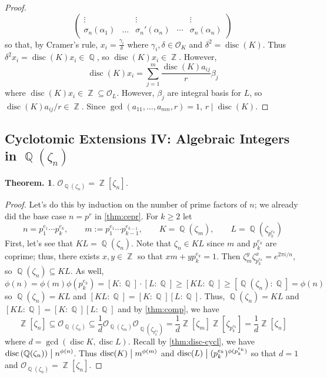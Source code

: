 \documentclass[11pt, a4paper]{memoir}
\DeclareMathOperator{\Q}{{\mathbb{Q}}}
\DeclareMathOperator{\Z}{{\mathbb{Z}}}
\renewcommand{\div}{\bigm|}
\theoremstyle{change}
\newtheorem{theorem}{Theorem.}[section]
\theoremstyle{plain}
\theoremstyle{nonumberplain}
\newtheorem{proof}{Proof}
\DeclareMathOperator{\disc}{disc}
\numberwithin{equation}{section}
\begin{document}
\begin{proof}
\begin{equation*}
\begin{pmatrix}
            \vdots&&\vdots&&\vdots\\
            \sigma_n(\alpha_1)&\hdots&\sigma_n'(\alpha_n)&\cdots&\sigma_n(\alpha_n)
        \end{pmatrix}
    \end{equation*}
    so that, by Cramer's rule, $x_i=\frac{\gamma_i}{\delta}$ where $\gamma_i,\delta\in\mathcal{O}_K$ and $\delta^2=\disc(K)$.
    Thus $\delta^2x_i=\disc(K)x_i\in\Q$, so $\disc(K)x_i\in\Z$.
    However,
    \begin{equation*}
        \disc(K)x_i = \sum\limits_{j=1}^m\frac{\disc(K)a_{ij}}{r}\beta_j
    \end{equation*}
    where $\disc(K)x_i\in\Z\subseteq\mathcal{O}_L$.
    However, $\beta_j$ are integral basis for $L$, so $\disc(K)a_{ij}/r\in\Z$.
    Since $\gcd(a_{11},\ldots,a_{mn},r)=1$, $r\mid\disc(K)$.
\end{proof}
\subsection{Cyclotomic Extensions IV: Algebraic Integers in \texorpdfstring{$\Q(\zeta_n)$}{Qzn}}
\begin{theorem}
    $\mathcal{O}_{\Q(\zeta_n)}=\Z[\zeta_n]$.
\end{theorem}
\begin{proof}
    Let's do this by induction on the number of prime factors of $n$; we already did the base case $n=p^r$ in \cref{thm:cepr}.
    For $k\geq 2$ let
    \begin{equation*}
        n=p_1^{e_1}\cdots p_k^{e_k},\qquad m:=p_1^{e_1}\cdots p_{k-1}^{e_{k-1}},\qquad K=\Q\left(\zeta_{m}\right),\qquad L=\Q\left(\zeta_{p_k^{e_k}}\right)
    \end{equation*}
    First, let's see that $KL=\Q(\zeta_n)$.
    Note that $\zeta_n\in KL$ since $m$ and $p_k^{e_k}$ are coprime; thus, there exists $x,y\in\Z$ so that $xm+yp_k^{e_k}=1$.
    Then $\zeta_m^y\zeta_{p_k^{e_k}}^x=e^{2\pi i/n}$, so $\Q(\zeta_n)\subseteq KL$.
    As well,
    \begin{equation*}
        \phi(n)=\phi(m)\phi\left(p_k^{e_k}\right)=[K:\Q]\cdot[L:\Q]\geq [KL:\Q]\geq[\Q(\zeta_n):\Q]=\phi(n)
    \end{equation*}
    so $\Q(\zeta_n)=KL$ and $[KL:\Q]=[K:\Q][L:\Q]$.
    Thus, $\Q(\zeta_n)=KL$ and $[KL:\Q]=[K:\Q][L:\Q]$ and by \cref{thm:comp}, we have
    \begin{equation*}
        \Z[\zeta_n]\subseteq \mathcal{O}_{\Q(\zeta_n)}\subseteq\frac{1}{d}\mathcal{O}_{\Q(\zeta_m)}\mathcal{O}_{\Q(\zeta_{p_k^{e_k}})}=\frac{1}{d}\Z[\zeta_m]\Z[\zeta_{p_k^{e_k}}]=\frac{1}{d}\Z[\zeta_n]
    \end{equation*}
    where $d=\gcd(\disc K,\disc L)$.
    Recall by \cref{thm:disc-cycl}, we have $\disc\left(\Q(\zeta_n)\right)\div n^{\phi(n)}$.
    Thus $\disc(K)\div m^{\phi(m)}$ and $\disc(L)\div (p_k^{e_k})^{\phi(p_k^{e_k})}$ so that $d=1$ and $\mathcal{O}_{\Q(\zeta_n)}=\Z[\zeta_n]$.
\end{proof}
\end{document}
